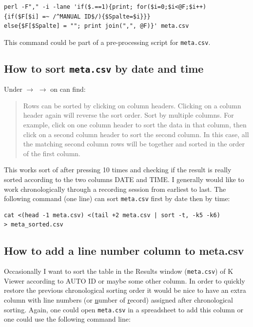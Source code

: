 \documentclass[English, 11pt, twoside, authoryear]{article}
\begin{document}
\begin{lstlisting}
perl -F"," -i -lane 'if($.==1){print; for($i=0;$i<@F;$i++)
{if($F[$i] =~ /^MANUAL ID$/){$Spalte=$i}}}
else{$F[$Spalte] = ""; print join(",", @F)}' meta.csv
\end{lstlisting}

This command could be part of a pre-processing script for \texttt{meta.csv}.

%
%
%
\subsection{How to sort \texttt{meta.csv} by date and time}
%
%
%
Under  $\rightarrow$  $\rightarrow$  on can find:

\begin{quote}
Rows can be sorted by clicking on column headers. Clicking on a column header again will reverse the sort order. Sort by multiple columns. For example, click on one column header to sort the data in that column, then click on a second column header to sort the second column. In this case, all the matching second column rows will be together and sorted in the order of the first column.
\end{quote}

This works sort of after pressing 10 times and checking if the result is really sorted according to the two columns DATE and TIME. I generally would like to work chronologically through a recording session from earliest to last. The following command (one line) can sort \texttt{meta.csv} first by date then by time:

\begin{lstlisting}
cat <(head -1 meta.csv) <(tail +2 meta.csv | sort -t, -k5 -k6) 
> meta_sorted.csv
\end{lstlisting}

%
%
%
\subsection{How to add a line number column to meta.csv}
%
%
%
Occasionally I want to sort the table in the Results window (\texttt{meta.csv}) of \textsf{K} Viewer according to AUTO ID or maybe some other column. In order to quickly restore the previous chronological sorting order it would be nice to have an extra column with line numbers (or \underline{n}umber of \underline{r}ecord) assigned after chronological sorting. Again, one could open \texttt{meta.csv} in a spreadsheet to add this column or one could use the following command line:
\end{document}
